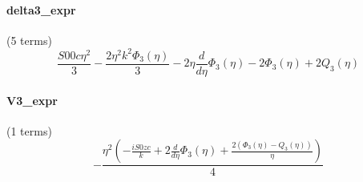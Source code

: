 \paragraph{delta3\_expr} (5 terms)
\begin{dmath}
\frac{S00c \eta^{2}}{3} - \frac{2 \eta^{2} k^{2} \Phi_{3}{\left(\eta \right)}}{3} - 2 \eta \frac{d}{d \eta} \Phi_{3}{\left(\eta \right)} - 2 \Phi_{3}{\left(\eta \right)} + 2 Q_{3}{\left(\eta \right)}
\end{dmath}
\paragraph{V3\_expr} (1 terms)
\begin{dmath}
- \frac{\eta^{2} \left(- \frac{i S0zc}{k} + 2 \frac{d}{d \eta} \Phi_{3}{\left(\eta \right)} + \frac{2 \left(\Phi_{3}{\left(\eta \right)} - Q_{3}{\left(\eta \right)}\right)}{\eta}\right)}{4}
\end{dmath}
